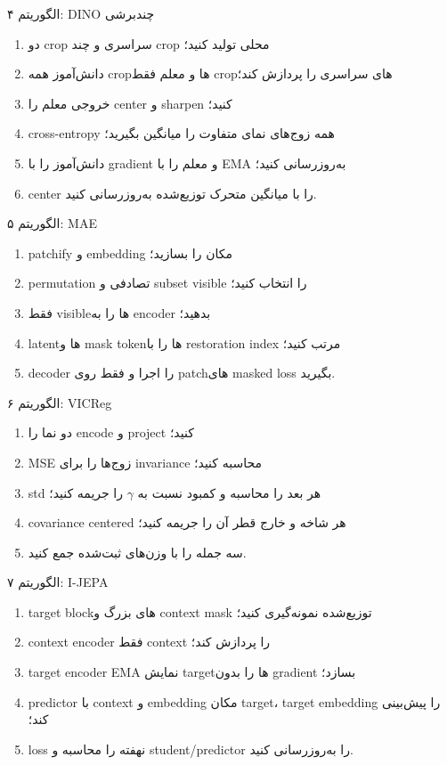 \documentclass[12pt,openany,oneside]{book}
\begin{document}
\begin{algorithmbox}{الگوریتم ۴: DINO چندبرشی}
\begin{enumerate}
\item دو crop سراسری و چند crop محلی تولید کنید؛
\item دانش‌آموز همه cropها و معلم فقط cropهای سراسری را پردازش کند؛
\item خروجی معلم را center و sharpen کنید؛
\item cross-entropy همه زوج‌های نمای متفاوت را میانگین بگیرید؛
\item دانش‌آموز را با gradient و معلم را با EMA به‌روزرسانی کنید؛
\item center را با میانگین متحرک توزیع‌شده به‌روزرسانی کنید.
\end{enumerate}
\end{algorithmbox}

\begin{algorithmbox}{الگوریتم ۵: MAE}
\begin{enumerate}
\item patchify و embedding مکان را بسازید؛
\item permutation تصادفی و subset visible را انتخاب کنید؛
\item فقط visibleها را به encoder بدهید؛
\item latentها و mask tokenها را با restoration index مرتب کنید؛
\item decoder را اجرا و فقط روی patchهای masked loss بگیرید.
\end{enumerate}
\end{algorithmbox}

\begin{algorithmbox}{الگوریتم ۶: VICReg}
\begin{enumerate}
\item دو نما را encode و project کنید؛
\item MSE زوج‌ها را برای invariance محاسبه کنید؛
\item std هر بعد را محاسبه و کمبود نسبت به $\gamma$ را جریمه کنید؛
\item covariance centered هر شاخه و خارج قطر آن را جریمه کنید؛
\item سه جمله را با وزن‌های ثبت‌شده جمع کنید.
\end{enumerate}
\end{algorithmbox}

\begin{algorithmbox}{الگوریتم ۷: I-JEPA}
\begin{enumerate}
\item target blockهای بزرگ و context mask توزیع‌شده نمونه‌گیری کنید؛
\item context encoder فقط context را پردازش کند؛
\item target encoder EMA نمایش targetها را بدون gradient بسازد؛
\item predictor با context و embedding مکان target، target embedding را پیش‌بینی کند؛
\item loss نهفته را محاسبه و student/predictor را به‌روزرسانی کنید.
\end{enumerate}
\end{algorithmbox}
\end{document}
